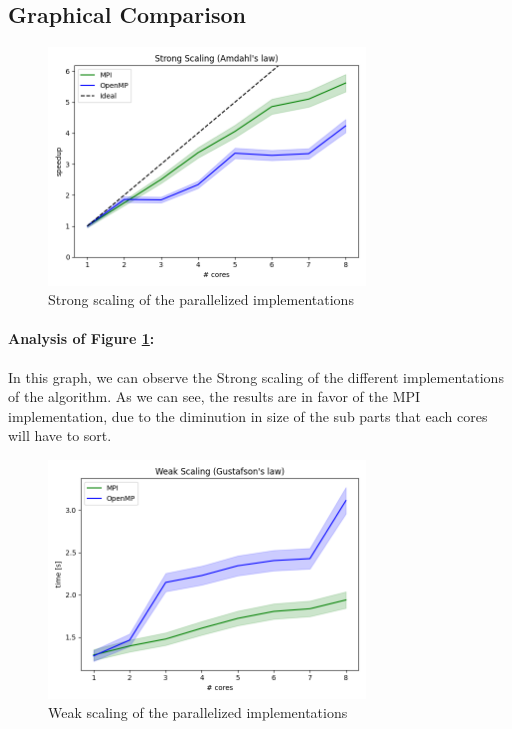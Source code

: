 \documentclass[12pt]{article}
\begin{document}
\subsection{Graphical Comparison}
\begin{figure}[H]
  \centering
  \includegraphics[width=0.75\textwidth]{../plots/strong_scaling.png}
  \caption{Strong scaling of the parallelized implementations}
  \label{fig:strong_scaling}
\end{figure}

\paragraph{Analysis of Figure \ref{fig:strong_scaling}:}
In this graph, we can observe the Strong scaling of the different implementations of the algorithm.
As we can see, the results are in favor of the MPI implementation, due to the diminution in size of the sub parts that each cores will have to sort.

\begin{figure}[H]
  \centering
  \includegraphics[width=0.75\textwidth]{../plots/weak_scaling.png}
  \caption{Weak scaling of the parallelized implementations}
  \label{fig:weak_scaling}
\end{figure}
\end{document}
